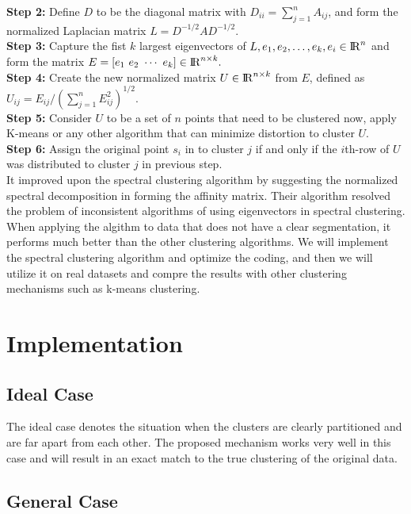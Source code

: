 \documentclass[11pt]{article}
\begin{document}
\textbf{Step 2:} Define $D$ to be the diagonal matrix with $D_{ii} =\sum_{j=1}^{n} A _{ij}$, and form the normalized Laplacian matrix $L = D^{-1/2}AD^{-1/2}$.\\

\textbf{Step 3:} Capture the fist $k$ largest eigenvectors of $L, e_1, e_2,  \ldots, e_k, e_i \in {\rm I\!R}^{n} $ and form the matrix $E = [e_1 ~e_2 ~\cdots ~e_k ] \in  {\rm I\!R}^{n\times k}.$\\

\textbf{Step 4:} Create the new normalized matrix $U \in {\rm I\!R}^{n\times k}$ from $E$, defined as $U_{ij}= E_{ij}/(\sum_{j=1}^{n}E_{ij}^2)^{1/2}$. \\

\textbf{Step 5:} Consider $U$ to be a set of $n$   points that need to be clustered now, apply K-means or any other algorithm that can minimize distortion to cluster $U$. \\

\textbf{Step 6:}  Assign the original point $s_i$ in to cluster $j$ if and only if the $i$th-row of $U$ was distributed to cluster $j$  in previous step.       \\

It improved upon the spectral clustering algorithm by suggesting the normalized spectral decomposition in forming the affinity matrix. Their algorithm resolved the problem of inconsistent algorithms of using eigenvectors in spectral clustering. When applying the algithm to data that does not have a clear segmentation, it performs much better than the other clustering algorithms. We will implement the spectral clustering algorithm and optimize the coding, and then we will utilize it on real datasets and compre the results with other clustering mechanisms such as k-means clustering.



\section{Implementation}
\subsection{Ideal Case}
The ideal case denotes the situation when the clusters are clearly partitioned and are far apart from each other. The proposed mechanism works very well in this case and will result in an exact match to the true clustering of the original data.
\subsection{General Case}
\end{document}
